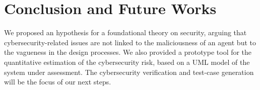 \documentclass[conference]{IEEEtran}
\newcommand{\fixnote}[2]{\textbf{\color{red}{FIX}}\footnote{{\bf #1:} #2}}
\begin{document}
%

\section{Conclusion and Future Works}
We proposed an hypothesis for a foundational theory on security, arguing that
cybersecurity-related issues are not linked to the maliciousness of an agent
but to the vagueness in the design processes.  We also provided a prototype
tool for the quantitative estimation of the cybersecurity risk, based on a UML
model of the system under assessment.
The cybersecurity verification and test-case generation will be the focus of our next steps.
\end{document}
